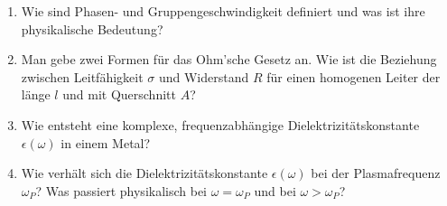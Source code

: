 \documentclass{scrartcl}
\begin{document}
\begin{enumerate}
    \item Wie sind Phasen- und Gruppengeschwindigkeit definiert und was ist
          ihre physikalische Bedeutung?

    \item Man gebe zwei Formen für das Ohm'sche Gesetz an. Wie ist die
          Beziehung zwischen Leitfähigkeit $\sigma$ und Widerstand $R$ 
          für einen homogenen Leiter der länge $l$ und mit 
          Querschnitt $A$?

    \item Wie entsteht eine komplexe, frequenzabhängige 
          Dielektrizitätskonstante $\epsilon(\omega)$ in einem Metal?

    \item Wie verhält sich die Dielektrizitätskonstante $\epsilon(\omega)$
          bei der Plasmafrequenz $\omega_P$? Was passiert physikalisch bei
          $\omega=\omega_P$ und bei $\omega>\omega_P$?

  \end{enumerate}
\end{document}
